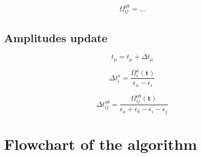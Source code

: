 \begin{equation}
  \begin{split}
    \Omega_{ij}^{ab} = ...
  \end{split}
\end{equation}


\subsection{Amplitudes update}
\hypertarget{sec:ccsd_update}{}
\label{sec:ccsd_update}

\begin{equation}
  t_\mu = t_\mu + \Delta t_\mu
\end{equation}

\begin{equation}
  \Delta t_i^a = \frac{\Omega_i^a(\mathbf{t})}{\epsilon_a - \epsilon_i}
\end{equation}

\begin{equation}
  \Delta t_{ij}^{ab} = \frac{\Omega_{ij}^{ab}(\mathbf{t})}
  {\epsilon_a + \epsilon_b - \epsilon_i - \epsilon_j}
\end{equation}



\newpage
\section{Flowchart of the algorithm}
\label{sec:ccsd_flowchart}





